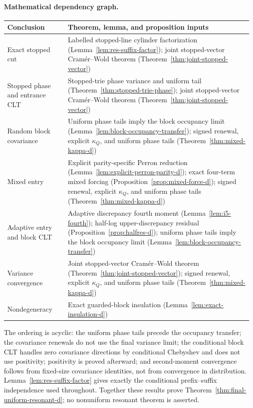 \documentclass[11pt]{article}
\numberwithin{equation}{section}
\newcommand{\1}{\mathbf 1}\newcommand{\F}{\mathcal F}\newcommand{\D}{\mathcal D}
\begin{document}
\paragraph{Mathematical dependency graph.}
\begin{center}\begin{tabular}{p{}p{}}
Conclusion&Theorem, lemma, and proposition inputs\\ \hline
Exact stopped cut&Labelled stopped-line cylinder factorization (Lemma~\ref{lem:res-suffix-factor}); joint stopped-vector Cram\'er--Wold theorem (Theorem~\ref{thm:joint-stopped-vector})\\
Stopped phase and entrance CLT&Stopped-trie phase variance and uniform tail (Theorem~\ref{thm:stopped-trie-phase}); joint stopped-vector Cram\'er--Wold theorem (Theorem~\ref{thm:joint-stopped-vector})\\
Random block covariance&Uniform phase tails imply the block occupancy limit (Lemma~\ref{lem:block-occupancy-transfer}); signed renewal, explicit $\kappa_Q$, and uniform phase tails (Theorem~\ref{thm:mixed-kappa-d})\\
Mixed entry&Explicit parity-specific Perron reduction (Lemma~\ref{lem:explicit-perron-parity-d}); exact four-term mixed forcing (Proposition~\ref{prop:mixed-force-d}); signed renewal, explicit $\kappa_Q$, and uniform phase tails (Theorem~\ref{thm:mixed-kappa-d})\\
Adaptive entry and block CLT&Adaptive discrepancy fourth moment (Lemma~\ref{lem:i5-fourth}); half-log upper-discrepancy residual (Proposition~\ref{prop:halfres-d}); uniform phase tails imply the block occupancy limit (Lemma~\ref{lem:block-occupancy-transfer})\\
Variance convergence&Joint stopped-vector Cram\'er--Wold theorem (Theorem~\ref{thm:joint-stopped-vector}); signed renewal, explicit $\kappa_Q$, and uniform phase tails (Theorem~\ref{thm:mixed-kappa-d})\\
Nondegeneracy&Exact guarded-block insulation (Lemma~\ref{lem:exact-insulation-d})
\end{tabular}\end{center}
The ordering is acyclic: the uniform phase tails precede the occupancy
transfer; the covariance renewals do not use the final variance limit; the
conditional block CLT handles zero covariance directions by conditional
Chebyshev and does not use positivity; positivity is proved afterward; and
second-moment convergence follows from fixed-size covariance identities,
not from convergence in distribution.  Lemma~\ref{lem:res-suffix-factor}
gives exactly the conditional prefix--suffix independence used throughout.
Together these results prove Theorem~\ref{thm:final-uniform-resonant-d}; no
nonuniform resonant theorem is asserted.
\end{document}
